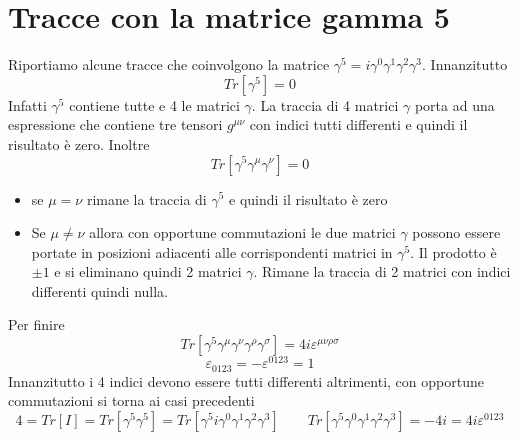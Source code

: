 \section{Tracce con la matrice gamma 5}
Riportiamo alcune tracce che coinvolgono la matrice $\gamma^5=i\gamma^0\gamma^1\gamma^2\gamma^3$. Innanzitutto 
$$
Tr[\gamma^5] = 0
$$
Infatti $\gamma^5$ contiene tutte e 4 le matrici $\gamma$. La traccia di 4 matrici $\gamma$ porta ad una espressione che contiene tre tensori $g^{\mu\nu}$ con indici tutti differenti e quindi il risultato è zero. Inoltre
$$
Tr[\gamma^5\gamma^\mu\gamma^\nu] = 0
$$
\begin{itemize}
    \item se $\mu=\nu$ rimane la traccia di $\gamma^5$ e quindi il risultato è zero
    \item Se $\mu\not=\nu$ allora con opportune commutazioni le due matrici $\gamma$ possono essere portate in posizioni adiacenti alle corrispondenti matrici in $\gamma^5$. Il prodotto è $\pm1$ e si eliminano quindi 2 matrici $\gamma$. Rimane la traccia di 2 matrici con indici differenti quindi nulla.
\end{itemize}
Per finire
$$
Tr[\gamma^5\gamma^\mu\gamma^\nu\gamma^\rho\gamma^\sigma] = 4i\varepsilon^{\mu\nu\rho\sigma}
$$
$$
\varepsilon_{0123} = -\varepsilon^{0123} = 1
$$
Innanzitutto i 4 indici devono essere tutti differenti altrimenti, con opportune commutazioni si torna ai casi precedenti
$$
4 = Tr[I] = Tr[\gamma^5\gamma^5] = Tr[\gamma^5 i\gamma^0\gamma^1\gamma^2\gamma^3] \qquad Tr[\gamma^5\gamma^0\gamma^1\gamma^2\gamma^3] = -4i = 4i\varepsilon^{0123}
$$
